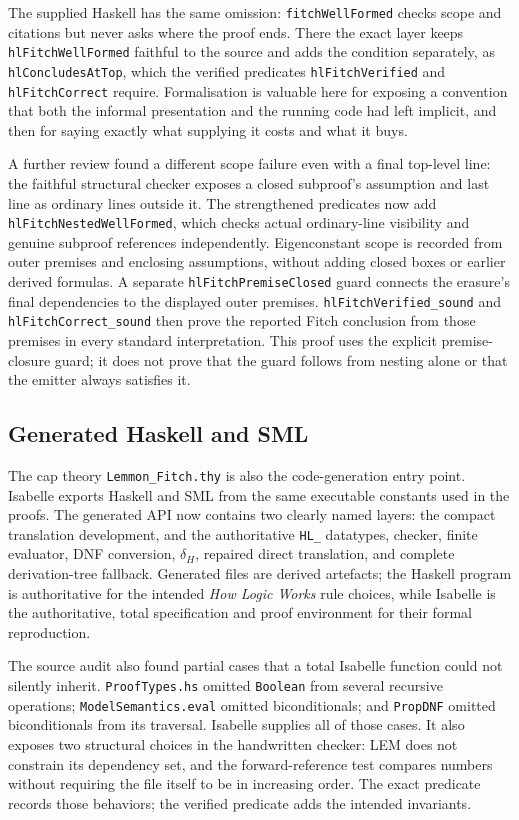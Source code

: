 \documentclass[11pt]{article}
\theoremstyle{plain}
\theoremstyle{definition}
\theoremstyle{remark}
\begin{document}
The supplied Haskell has the same omission: \verb|fitchWellFormed| checks scope
and citations but never asks where the proof ends. There the exact layer keeps
\verb|hlFitchWellFormed| faithful to the source and adds the condition
separately, as \verb|hlConcludesAtTop|, which the verified predicates
\verb|hlFitchVerified| and \verb|hlFitchCorrect| require. Formalisation is
valuable here for exposing a convention that both the informal presentation and
the running code had left implicit, and then for saying exactly what supplying
it costs and what it buys.

A further review found a different scope failure even with a final top-level
line: the faithful structural checker exposes a closed subproof's assumption
and last line as ordinary lines outside it. The strengthened predicates now
add \verb|hlFitchNestedWellFormed|, which checks actual ordinary-line visibility
and genuine subproof references independently. Eigenconstant scope is recorded
from outer premises and enclosing assumptions, without adding closed boxes or
earlier derived formulas. A separate \verb|hlFitchPremiseClosed| guard connects
the erasure's final dependencies to the displayed outer premises.
\verb|hlFitchVerified_sound| and \verb|hlFitchCorrect_sound| then prove the
reported Fitch conclusion from those premises in every standard interpretation.
This proof uses the explicit premise-closure guard; it does not prove that
the guard follows from nesting alone or that the emitter always satisfies it.

\subsection{Generated Haskell and SML}

The cap theory \verb|Lemmon_Fitch.thy| is also the code-generation entry point.
Isabelle exports Haskell and SML from the same executable constants used in
the proofs. The generated API now contains two clearly named layers: the
compact translation development, and the authoritative \verb|HL_| datatypes,
checker, finite evaluator, DNF conversion, $\delta_H$, repaired direct
translation, and complete derivation-tree fallback. Generated files
are derived artefacts; the Haskell program is authoritative for the intended
\emph{How Logic Works} rule choices, while Isabelle is the authoritative,
total specification and proof environment for their formal reproduction.

The source audit also found partial cases that a total Isabelle function could
not silently inherit. \verb|ProofTypes.hs| omitted \verb|Boolean| from several
recursive operations; \texttt{ModelSemantics.}\allowbreak\texttt{eval}
omitted biconditionals; and
\verb|PropDNF| omitted biconditionals from its traversal. Isabelle supplies
all of those cases. It also exposes two structural choices in the handwritten
checker: LEM does not constrain its dependency set, and the forward-reference
test compares numbers without requiring the file itself to be in increasing
order. The exact predicate records those behaviors; the verified predicate
adds the intended invariants.
\end{document}
